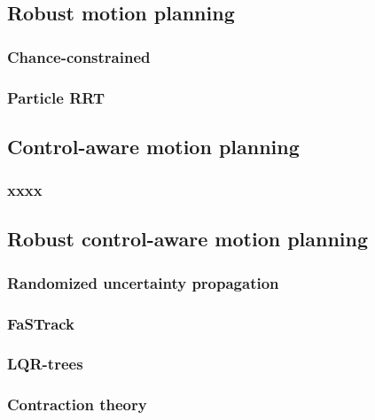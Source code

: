 \subsection{Robust motion planning}
\subsubsection{Chance-constrained}
\subsubsection{Particle RRT}
\subsection{Control-aware motion planning}
\subsubsection{xxxx}
\subsection{Robust control-aware motion planning}
\subsubsection{Randomized uncertainty propagation}
\subsubsection{FaSTrack}
\subsubsection{LQR-trees}
\subsubsection{Contraction theory}

\todomarker{}